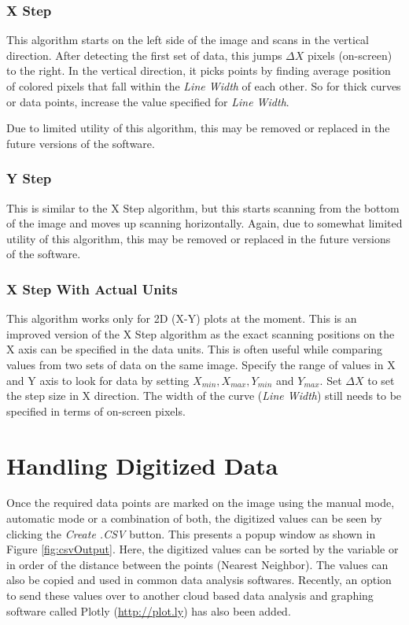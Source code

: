 \documentclass[letterpaper, 10pt]{article}
\begin{document}
\subsubsection{X Step}
This algorithm starts on the left side of the image and scans in the vertical direction. After detecting the first set of data, this jumps $\Delta X$ pixels (on-screen) to the right. In the vertical direction, it picks points by finding average position of colored pixels that fall within the \emph{Line Width} of each other. So for thick curves or data points, increase the value specified for \emph{Line Width}.

Due to limited utility of this algorithm, this may be removed or replaced in the future versions of the software.
\subsubsection{Y Step}
This is similar to the X Step algorithm, but this starts scanning from the bottom of the image and moves up scanning horizontally. Again, due to somewhat limited utility of this algorithm, this may be removed or replaced in the future versions of the software.
\subsubsection{X Step With Actual Units}
This algorithm works only for 2D (X-Y) plots at the moment. This is an improved version of the X Step algorithm as the exact scanning positions on the X axis can be specified in the data units. This is often useful while comparing values from two sets of data on the same image. Specify the range of values in X and Y axis to look for data by setting $X_{min}, X_{max}, Y_{min}$ and $Y_{max}$. Set $\Delta X$ to set the step size in X direction. The width of the curve (\emph{Line Width}) still needs to be specified in terms of on-screen pixels.
\section{Handling Digitized Data}
Once the required data points are marked on the image using the manual mode, automatic mode or a combination of both, the digitized values can be seen by clicking the \emph{Create .CSV} button. This presents a popup window as shown in Figure \ref{fig:csvOutput}. Here, the digitized values can be sorted by the variable or in order of the distance between the points (Nearest Neighbor). The values can also be copied and used in common data analysis softwares. Recently, an option to send these values over to another cloud based data analysis and graphing software called Plotly (\url{http://plot.ly}) has also been added.
 
\end{document}
